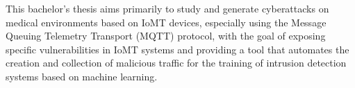 This bachelor's thesis aims primarily to study and generate cyberattacks on medical environments based on IoMT devices, especially using the Message Queuing Telemetry Transport (MQTT) protocol, with the goal of exposing specific vulnerabilities in IoMT systems and providing a tool that automates the creation and collection of malicious traffic for the training of intrusion detection systems based on machine learning.